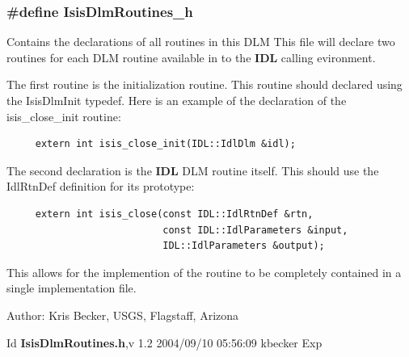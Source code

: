 \subsubsection{\setlength{\rightskip}{0pt plus 5cm}\#define Isis\-Dlm\-Routines\_\-h}\label{IsisDlmRoutines_8h_a0}


Contains the declarations of all routines in this DLM This file will declare two routines for each DLM routine available in to the {\bf IDL} calling evironment.

The first routine is the initialization routine. This routine should declared using the Isis\-Dlm\-Init typedef. Here is an example of the declaration of the isis\_\-close\_\-init routine: 

\footnotesize\begin{verbatim}     extern int isis_close_init(IDL::IdlDlm &idl);
\end{verbatim}\normalsize


The second declaration is the {\bf IDL} DLM routine itself. This should use the Idl\-Rtn\-Def definition for its prototype: 

\footnotesize\begin{verbatim}     extern int isis_close(const IDL::IdlRtnDef &rtn, 
                           const IDL::IdlParameters &input, 
                           IDL::IdlParameters &output);
\end{verbatim}\normalsize


This allows for the implemention of the routine to be completely contained in a single implementation file.

\begin{Desc}
\item[Author:]Kris Becker, USGS, Flagstaff, Arizona \begin{Desc}
\item[Id]{\bf Isis\-Dlm\-Routines.h},v 1.2 2004/09/10 05:56:09 kbecker Exp \end{Desc}
\end{Desc}

